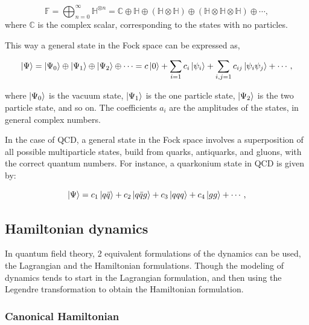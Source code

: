 \documentclass[11pt,a4paper,twoside,pdf]{article}
\numberwithin{equation}{section}
\begin{document}
\begin{equation}
    \mathbb{F} = \bigoplus_{n=0}^{\infty}  \mathbb{H}^{\otimes n} = 
    \mathbb{C} \oplus \mathbb{H} \oplus (\mathbb{H} \otimes \mathbb{H}) 
    \oplus (\mathbb{H} \otimes \mathbb{H}\otimes \mathbb{H}) \oplus \cdots,
\end{equation}
where $\mathbb{C}$ is the complex scalar, corresponding to the states with no particles.

This way a general state in the Fock space can be expressed as,

\begin{equation}
    \ket{\Psi} = \ket{\Psi_0} \oplus \ket{\Psi_1} \oplus
    \ket{\Psi_2} \oplus \cdots = c \ket{0} + \sum_{i=1}c_i \ket{\psi_i} +
    \sum_{i,j=1}c_{ij} \ket{\psi_i \psi_j} + \cdots,
\end{equation}

where $\ket{\Psi_0}$ is the vacuum state, $\ket{\Psi_1}$ is the one particle
state, $\ket{\Psi_2}$ is the two particle state, and so on. The coefficients $a_i$
are the amplitudes of the states, in general complex numbers. 

In the case of QCD, a general state in the Fock space involves a superposition of all 
possible multiparticle states, build from quarks, antiquarks, and gluons, with the
correct quantum numbers. For instance, a quarkonium state in QCD is given by:

\begin{equation}
    \ket{\Psi} = c_1 \ket{q\bar{q}} + c_2 \ket{q\bar{q}g} + c_3 \ket{qqq} 
    + c_4 \ket{gg} + \cdots,
\end{equation}

\subsection{Hamiltonian dynamics}

In quantum field theory, 2 equivalent formulations of the dynamics can be used, 
the Lagrangian and the Hamiltonian formulations. Though the modeling of dynamics 
tends to start in the Lagrangian formulation, and then using the Legendre transformation
to obtain the Hamiltonian formulation. 

\subsubsection{Canonical Hamiltonian}\label{sec:canonical_hamiltonian}
\end{document}
